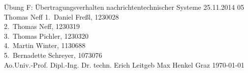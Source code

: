 \TUHeader                          %
{Übung F: Übertragungsverhalten nachrichtentechnischer Systeme}                       %
{25.11.2014}                        %
{05}                            %
{Thomas Neff}                   %
{
1.~Daniel Freßl, 1230028\\
2.~Thomas Neff, 1230319\\                    %
3.~Thomas Pichler, 1230320 \\                   %
4.~Martin Winter, 1130688\\
5.~Bernadette Schreyer, 1073076\\
}
{Ao.Univ.-Prof. Dipl.-Ing. Dr. techn. Erich Leitgeb}
{Max Henkel}                          %
{Graz}                              %
{\today}                            %




\pagebreak
  
\tableofcontents
  
\pagebreak